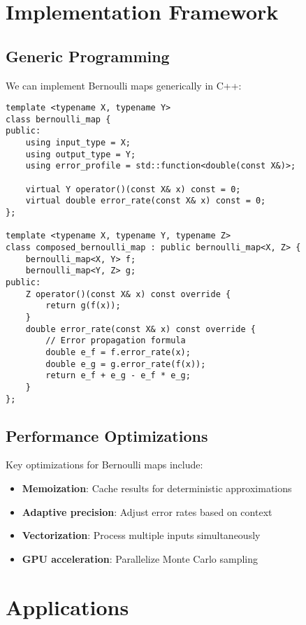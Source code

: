 \documentclass[11pt,final,hidelinks]{article}
\begin{document}
\section{Implementation Framework}

\subsection{Generic Programming}

We can implement Bernoulli maps generically in C++:

\begin{verbatim}
template <typename X, typename Y>
class bernoulli_map {
public:
    using input_type = X;
    using output_type = Y;
    using error_profile = std::function<double(const X&)>;
    
    virtual Y operator()(const X& x) const = 0;
    virtual double error_rate(const X& x) const = 0;
};

template <typename X, typename Y, typename Z>
class composed_bernoulli_map : public bernoulli_map<X, Z> {
    bernoulli_map<X, Y> f;
    bernoulli_map<Y, Z> g;
public:
    Z operator()(const X& x) const override {
        return g(f(x));
    }
    double error_rate(const X& x) const override {
        // Error propagation formula
        double e_f = f.error_rate(x);
        double e_g = g.error_rate(f(x));
        return e_f + e_g - e_f * e_g;
    }
};
\end{verbatim}

\subsection{Performance Optimizations}

Key optimizations for Bernoulli maps include:
\begin{itemize}
    \item \textbf{Memoization}: Cache results for deterministic approximations
    \item \textbf{Adaptive precision}: Adjust error rates based on context
    \item \textbf{Vectorization}: Process multiple inputs simultaneously
    \item \textbf{GPU acceleration}: Parallelize Monte Carlo sampling
\end{itemize}

\section{Applications}
\end{document}
